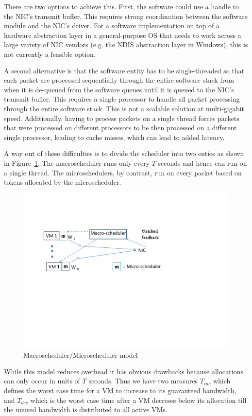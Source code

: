 There are two options to achieve this. First, the software could use a handle to
the NIC's transmit buffer.  This requires strong coordination between the
software module and the NIC's driver.  For a software implementation on top of a
hardware abstraction layer in a general-purpose OS that needs to work across a
large variety of NIC vendors (e.g. the NDIS abstraction layer in Windows), this
is not currently a feasible option.  

A second alternative is that the software entity has to be single-threaded so
that each packet are processed sequentially through the entire software stack
from when it is de-queued from the software queues until it is queued to the
NIC's transmit buffer. This requires a single processor to handle all packet
processing through the entire software stack. This is not a scalable solution at
multi-gigabit speed.  Additionally, having to process packets on a single thread
forces packets that were processed on different processors to be then processed
on a different single processor, leading to cache misses, which can lead to
added latency.

A way out of these difficulties is to divide the scheduler into two enties as
shown in Figure~\ref{fig:macroscheduler}.   The macroscheduler runs only every
$T$ seconds and hence can run on a single thread.   The microschedulers, by
contrast, run on every packet based on tokens allocated by the microscheduler.   

\begin{figure}
\centering
\includegraphics[width=\columnwidth, trim=6mm 90mm 20mm 10mm]{figures/macroschedule}
\caption{Macroscheduler/Microscheduler model}
\label{fig:macroscheduler}
\vspace{-3mm}
\end{figure}

While this model reduces overhead it has obvious drawbacks because allocations
can only occur in units of $T$ seconds.   Thus we have two measures $T_{inc}$
which defines the worst case time for a VM to increase to its guaranteed
bandwidth, and $T_{dec}$ which is the worst case time after a VM decreses below
its allocation till the unused bandwidth is distributed to all active VMs. 
